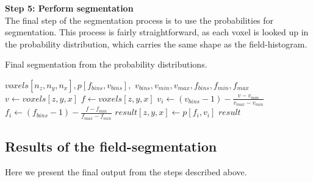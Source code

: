 \vspace{\baselineskip}
\noindent\textbf{Step 5: Perform segmentation} \\
The final step of the segmentation process is to use the probabilities for segmentation.
This process is fairly straightforward, as each voxel is looked up in the probability distribution,
which carries the same shape as the field-histogram.

\begin{algorithm}
    \caption{Final segmentation from the probability distributions.}
    \label{alg:segment}
    \begin{algorithmic}
         {$voxels[n_z,n_y,n_x], p[f_{bins},v_{bins}],$ \newline \indent \indent $v_{bins}, v_{min}, v_{max}, f_{bins}, f_{min}, f_{max}$}
                \State $v \gets voxels[z,y,x]$
                    \State $f \gets voxels[z,y,x]$
                        \State $v_i \gets (v_{bins} - 1) - \frac{v - v_{min}}{v_{max} - v_{min}}$
                        \State $f_i \gets (f_{bins} - 1) - \frac{f - f_{min}}{f_{max} - f_{min}}$
                        \State $result[z,y,x] \gets p[f_i, v_i]$
                    \EndIf
                \EndIf
            \EndFor
            \Return $result$
        \EndFunction
    \end{algorithmic}
\end{algorithm}

\subsection{Results of the field-segmentation}

Here we present the final output from the steps described above.

